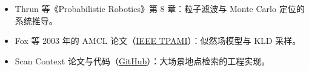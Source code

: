 \begin{reading}

\begin{itemize}
  \item Thrun 等《Probabilistic Robotics》第 8 章：粒子滤波与 Monte Carlo 定位的系统推导。
  \item Fox 等 2003 年的 AMCL 论文（\href{https://ieeexplore.ieee.org/document/1249223}{IEEE TPAMI}）：似然场模型与 KLD 采样。
  \item Scan Context 论文与代码（\href{https://github.com/irapkaist/scancontext}{GitHub}）：大场景地点检索的工程实现。
\end{itemize}


\end{reading}
